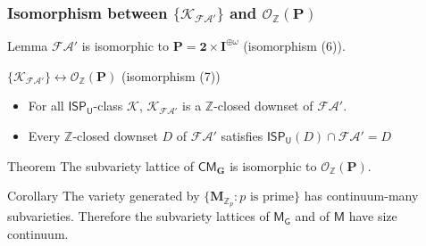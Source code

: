 \documentclass[professionalfont, 10pt]{beamer} %
\theoremstyle{plain}
\theoremstyle{definition}
\newcommand{\m}[1]{{\mathbf {#1} }}
\newcommand{\bb}[1]{\mathbb {#1}}
\begin{document}
\begin{frame}
\frametitle{Isomorphism between $\{\mathcal{K}_{\mathcal{FA}'}\}$ and $\mathcal{O}_{\bb{Z}}(\m P)$}
\begin{block}{Lemma}
    $\mathcal{FA}'$ is isomorphic to $\m P = \m 2 \times \m I^{\oplus \omega}$ (isomorphism (6)).
\end{block}
\pause
\begin{block}{$\{\mathcal{K}_{\mathcal{FA}'}\} \leftrightarrow \mathcal{O}_{\bb{Z}}(\m P)$ (isomorphism (7))}
\begin{itemize}
    \item For all $\mathsf{ISP_U}$-class $\mathcal{K}$, $\mathcal{K}_{\mathcal{FA}'}$ is a $\bb{Z}$-closed downset of $\mathcal{FA}'$.

    \item Every $\bb{Z}$-closed downset $D$ of $\mathcal{FA}'$ satisfies $\mathsf{ISP_U}(D) \cap \mathcal{FA}' = D$
\end{itemize}
\end{block}
\pause
\begin{block}{Theorem}
    The subvariety lattice of $\mathsf{CM}_{\mathbf{G}}$ is isomorphic to $\mathcal{O}_{\mathbb{Z}}(\m P)$.
\end{block}
\pause
\begin{block}{Corollary}
    The variety generated by $\{\m M_{\mathbb{Z}_p}: p \text{ is prime}\}$ has continuum-many subvarieties. 
    Therefore the subvariety lattices of $\mathsf{M_G}$ and of $\mathsf{M}$ have size continuum.
\end{block}

\end{frame}
\end{document}
